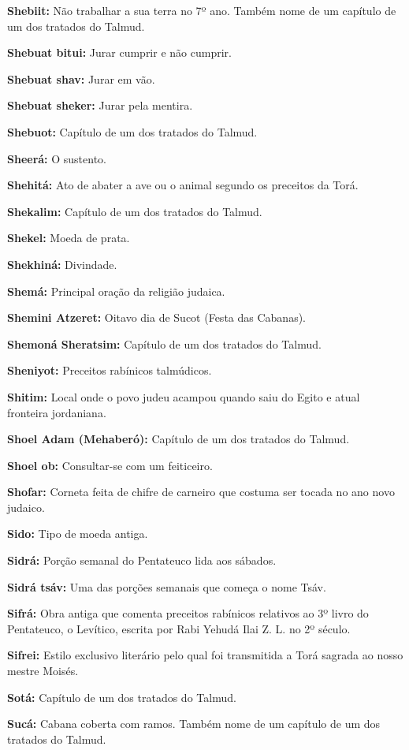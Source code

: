 \begin{hangparas}{.25in}{1}
{\textbf{Shebiit:} Não trabalhar a sua terra no 7º ano. Também nome de
um capítulo de um dos tratados do Talmud.

\textbf{Shebuat bitui:} Jurar cumprir e não cumprir.

\textbf{Shebuat shav:} Jurar em vão.

\textbf{Shebuat sheker:} Jurar pela mentira.

\textbf{Shebuot:} Capítulo de um dos tratados do Talmud.

\textbf{Sheerá:} O sustento.

\textbf{Shehitá:} Ato de abater a ave ou o animal segundo os preceitos
da Torá.

\textbf{Shekalim:} Capítulo de um dos tratados do Talmud.

\textbf{Shekel:} Moeda de prata.

\textbf{Shekhiná:} Divindade.

\textbf{Shemá:} Principal oração da religião judaica.

\textbf{Shemini Atzeret:} Oitavo dia de Sucot (Festa das Cabanas).

\textbf{Shemoná Sheratsim:} Capítulo de um dos tratados do Talmud.

\textbf{Sheniyot:} Preceitos rabínicos talmúdicos.

\textbf{Shitim:} Local onde o povo judeu acampou quando saiu do Egito e
atual fronteira jordaniana.

\textbf{Shoel Adam (Mehaberó):} Capítulo de um dos tratados do Talmud.

\textbf{Shoel ob:} Consultar-se com um feiticeiro.

\textbf{Shofar:} Corneta feita de chifre de carneiro que costuma ser
tocada no ano novo judaico.

\textbf{Sido:} Tipo de moeda antiga.

\textbf{Sidrá:} Porção semanal do Pentateuco lida aos sábados.

\textbf{Sidrá tsáv:} Uma das porções semanais que começa o nome Tsáv.

\textbf{Sifrá:} Obra antiga que comenta preceitos rabínicos relativos
ao 3º livro do Pentateuco, o Levítico, escrita por Rabi Yehudá Ilai Z.
L. no 2º século.

\textbf{Sifrei:} Estilo exclusivo literário pelo qual
foi transmitida a Torá sagrada ao nosso mestre Moisés.

\textbf{Sotá:} Capítulo de um dos tratados do Talmud.

\textbf{Sucá:} Cabana coberta com ramos. Também nome de um capítulo de
um dos tratados do Talmud.

}
\end{hangparas}
